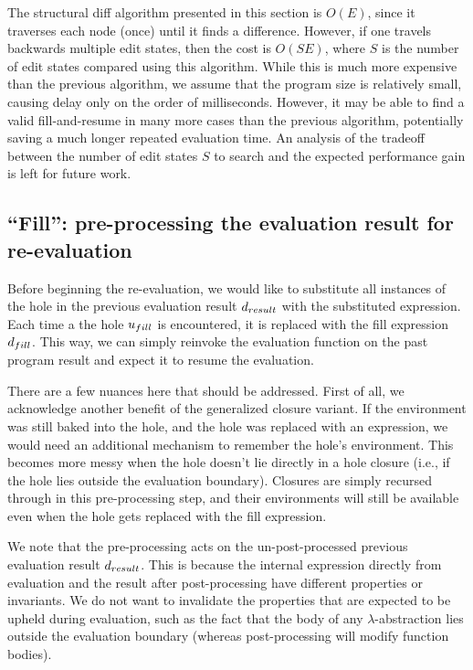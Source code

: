 The structural diff algorithm presented in this section is $O(E)$, since it traverses each node (once) until it finds a difference. However, if one travels backwards multiple edit states, then the cost is $O(SE)$, where $S$ is the number of edit states compared using this algorithm. While this is much more expensive than the previous algorithm, we assume that the program size is relatively small, causing delay only on the order of milliseconds. However, it may be able to find a valid fill-and-resume in many more cases than the previous algorithm, potentially saving a much longer repeated evaluation time. An analysis of the tradeoff between the number of edit states $S$ to search and the expected performance gain is left for future work.

\subsection{``Fill'': pre-processing the evaluation result for re-evaluation}
\label{sec:far-preprocessing}

Before beginning the re-evaluation, we would like to substitute all instances of the hole in the previous evaluation result $d_{result}$ with the substituted expression. Each time a the hole $u_{fill}$ is encountered, it is replaced with the fill expression $d_{fill}$. This way, we can simply reinvoke the evaluation function on the past program result and expect it to resume the evaluation.

There are a few nuances here that should be addressed. First of all, we acknowledge another benefit of the generalized closure variant. If the environment was still baked into the hole, and the hole was replaced with an expression, we would need an additional mechanism to remember the hole's environment. This becomes more messy when the hole doesn't lie directly in a hole closure (i.e., if the hole lies outside the evaluation boundary). Closures are simply recursed through in this pre-processing step, and their environments will still be available even when the hole gets replaced with the fill expression.

We note that the pre-processing acts on the un-post-processed previous evaluation result $d_{result}$. This is because the internal expression directly from evaluation and the result after post-processing have different properties or invariants. We do not want to invalidate the properties that are expected to be upheld during evaluation, such as the fact that the body of any $\lambda$-abstraction lies outside the evaluation boundary (whereas post-processing will modify function bodies).

